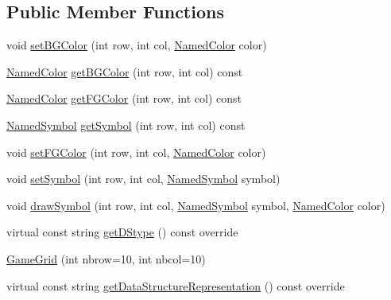 \subsection*{Public Member Functions}
\begin{DoxyCompactItemize}
\item 
void \mbox{\hyperlink{classbridges_1_1game_1_1_game_grid_a141dbed75aeb34498ee0f8ad17c2cb6c}{set\+B\+G\+Color}} (int row, int col, \mbox{\hyperlink{namespacebridges_1_1game_afaa832a4322b25b6a4ebfba832f10f26}{Named\+Color}} color)
\item 
\mbox{\hyperlink{namespacebridges_1_1game_afaa832a4322b25b6a4ebfba832f10f26}{Named\+Color}} \mbox{\hyperlink{classbridges_1_1game_1_1_game_grid_ae63280e78a80eb0fe72050afa8ef2a63}{get\+B\+G\+Color}} (int row, int col) const
\item 
\mbox{\hyperlink{namespacebridges_1_1game_afaa832a4322b25b6a4ebfba832f10f26}{Named\+Color}} \mbox{\hyperlink{classbridges_1_1game_1_1_game_grid_a6d38c8ac0d4ccbdd1b2b1c5d2f445d9a}{get\+F\+G\+Color}} (int row, int col) const
\item 
\mbox{\hyperlink{namespacebridges_1_1game_ab9a19c7ab6e2ebac2f95180e21733487}{Named\+Symbol}} \mbox{\hyperlink{classbridges_1_1game_1_1_game_grid_aac18709133e1e2e6e77708779cabc553}{get\+Symbol}} (int row, int col) const
\item 
void \mbox{\hyperlink{classbridges_1_1game_1_1_game_grid_add272657d570437edc849eb7cfd061fb}{set\+F\+G\+Color}} (int row, int col, \mbox{\hyperlink{namespacebridges_1_1game_afaa832a4322b25b6a4ebfba832f10f26}{Named\+Color}} color)
\item 
void \mbox{\hyperlink{classbridges_1_1game_1_1_game_grid_aaca03d00599251edb5312e9ba51dd62e}{set\+Symbol}} (int row, int col, \mbox{\hyperlink{namespacebridges_1_1game_ab9a19c7ab6e2ebac2f95180e21733487}{Named\+Symbol}} symbol)
\item 
void \mbox{\hyperlink{classbridges_1_1game_1_1_game_grid_a32c5c19c1dff8d50001d2aa57cbda70b}{draw\+Symbol}} (int row, int col, \mbox{\hyperlink{namespacebridges_1_1game_ab9a19c7ab6e2ebac2f95180e21733487}{Named\+Symbol}} symbol, \mbox{\hyperlink{namespacebridges_1_1game_afaa832a4322b25b6a4ebfba832f10f26}{Named\+Color}} color)
\item 
virtual const string \mbox{\hyperlink{classbridges_1_1game_1_1_game_grid_a07da19700a077e3d0f2cde2cade2ba60}{get\+D\+Stype}} () const override
\item 
\mbox{\hyperlink{classbridges_1_1game_1_1_game_grid_a00d0b39cd640fe338a96961ca1793191}{Game\+Grid}} (int nbrow=10, int nbcol=10)
\item 
virtual const string \mbox{\hyperlink{classbridges_1_1game_1_1_game_grid_aefbf4969375a174cefd8e2edf9fb6900}{get\+Data\+Structure\+Representation}} () const override
\end{DoxyCompactItemize}
